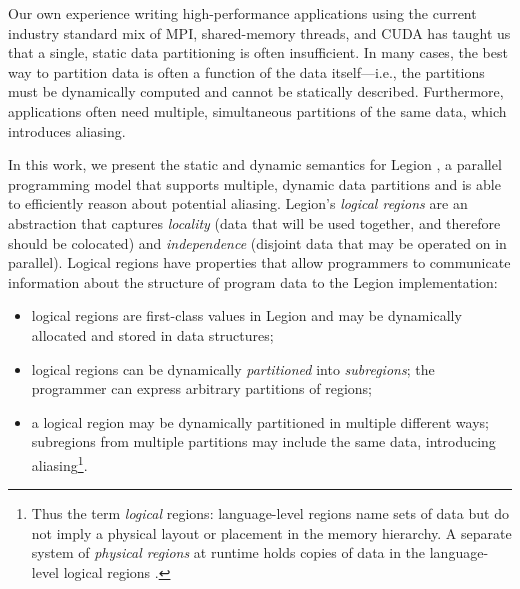Our own experience writing high-performance applications
using the current industry standard mix of MPI, shared-memory
threads, and CUDA has taught us that a
single, static data partitioning is often insufficient.  In many cases, the
best way to partition data is often a function of the data
itself---i.e., the partitions must be dynamically computed and cannot be statically described.
Furthermore, applications often need multiple, simultaneous partitions of
the same data, which introduces aliasing.

In this work, we present the static and dynamic semantics for Legion \cite{Legion12},
a parallel programming model that supports multiple, dynamic data partitions and is
able to efficiently reason about potential aliasing.
Legion's {\em logical regions} are an abstraction that captures {\em locality} 
(data that will be used together, and therefore should be colocated) 
and {\em independence} (disjoint data that may be operated on in parallel).  
Logical regions have properties that allow programmers to communicate information
about the structure of program data to the Legion implementation:
\begin{itemize}
\item  logical regions are first-class values in Legion
and may be dynamically allocated and stored in data structures;

\item logical regions can be dynamically {\em partitioned} into {\em subregions}; 
the programmer can express arbitrary partitions of regions;

\item  a logical region may be dynamically partitioned in multiple different ways;
subregions from multiple partitions may include the same data, introducing 
aliasing\footnote{Thus
  the term {\em logical} regions: language-level regions
  name sets of data but do not imply a physical layout or placement in
  the memory hierarchy. A separate system of {\em physical regions} at
  runtime holds copies of data in the language-level logical regions
  \cite{Legion12}.}.

\end{itemize}



